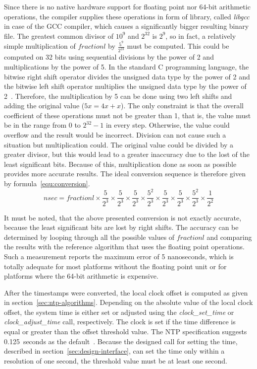 Since there is no native hardware support for floating point nor 64-bit arithmetic operations,
the compiler supplies these operations in form of library, called {\it{libgcc}} in case of the GCC compiler,
which causes a significantly bigger resulting binary file.
The greatest common divisor of $10^9$ and $2^{32}$ is $2^9$,
so in fact, a relatively simple multiplication of $fractionl$ by $\frac{5^9}{2^{23}}$ must be computed.
This could be computed on 32 bits using sequential
divisions by the power of 2 and multiplications by the power of 5.
In the standard C programming language, the bitwise right shift operator divides the unsigned data type by the power of 2
and the bitwise left shift operator multiplies the unsigned data type by the power of 2~\cite{c99}.
Therefore, the multiplication by 5 can be done using two left shifts and
adding the original value ($5x = 4x + x$).
The only constraint is that the overall coefficient of these operations must not be greater than 1,
that is, the value must be in the range from $0$ to $2^{32}-1$ in every step.
Otherwise, the value could overflow and the result would be incorrect.
Division can not cause such a situation but multiplication could.
The original value could be divided by a greater divisor,
but this would lead to a greater inaccuracy due to the lost of the least significant bits.
Because of this, multiplication done as soon as possible provides more accurate results.
The ideal conversion sequence is therefore given by formula~\ref{equ:conversion}.
\begin{equation}
\label{equ:conversion}
nsec = fractionl \times \frac{5}{2^3} \times \frac{5}{2^3} \times \frac{5}{2^3} \times \frac{5^2}{2^3} \times \frac{5}{2^3}  \times \frac{5}{2^3} \times \frac{5^2}{2^3} \times \frac{1}{2^2}
\end{equation}

It must be noted, that the above presented conversion is not exactly accurate,
because the least significant bits are lost by right shifts. %
The accuracy can be determined by looping through all the possible values of $fractionl$ %
and comparing the results with the reference algorithm that uses the floating point operations.
Such a measurement reports the maximum error of 5 nanoseconds,
which is totally adequate for most platforms without the floating point unit or
for platforms where the 64-bit arithmetic is expensive.

After the timestamps were converted, the local clock offset is computed
as given in section~\ref{sec:ntp-algorithms}.
Depending on the absolute value of the local clock offset,
the system time is either set or adjusted using the {\it{clock\_set\_time}}
or {\it{clock\_adjust\_time}} call, respectively.
The clock is set if the time difference is equal or greater than
the offset threshold value.
The NTP specification suggests 0.125~seconds as the default~\cite{rfc5905}.
Because the designed call for setting the time, described in section~\ref{sec:design-interface},
can set the time only within a resolution of one second,
the threshold value must be at least one second.
